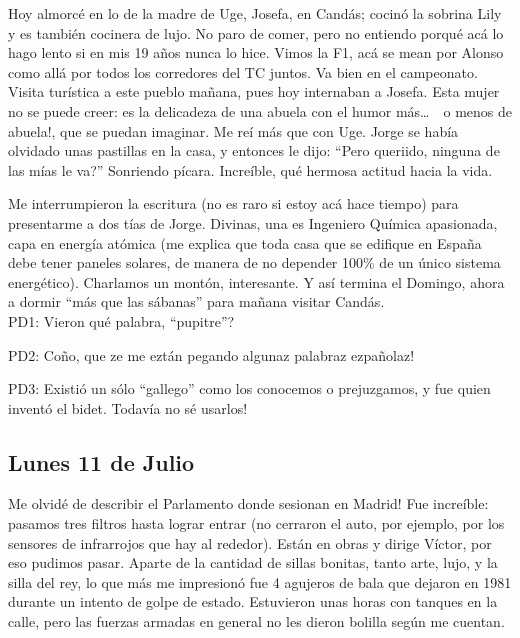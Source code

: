 Hoy almorc\'e en lo de la madre de Uge, Josefa, en Cand\'as; cocin\'o la
sobrina Lily y es tambi\'en cocinera de lujo. No paro de comer, pero no
entiendo porqu\'e ac\'a lo hago lento si en mis 19 a\~nos nunca lo hice. Vimos
la F1, ac\'a se mean por Alonso como all\'a por todos los corredores del
{\small TC} juntos. Va bien en el campeonato. Visita tur\'istica a este pueblo
ma\~nana, pues hoy internaban a Josefa. Esta mujer no se puede creer: es la
delicadeza de una abuela con el humor m\'as\ldots\ \ \textexclamdown o menos
de abuela!, que se puedan imaginar. Me re\'i m\'as que con Uge. Jorge se
hab\'ia olvidado unas pastillas en la casa, y entonces le dijo: ``Pero queriido,
\textquestiondown ninguna de las m\'ias le va?'' Sonriendo p\'icara.
Incre\'ible, qu\'e hermosa actitud hacia la vida.

Me interrumpieron la escritura (no es raro si estoy ac\'a hace tiempo) para
presentarme a dos t\'ias de Jorge. Divinas, una es Ingeniero Qu\'imica
apasionada, capa en energ\'ia at\'omica (me explica que toda casa que se
edifique en Espa\~na debe tener paneles solares, de manera de no depender
100\% de un \'unico sistema energ\'etico). Charlamos un mont\'on,
interesante. Y as\'i termina el Domingo, ahora a dormir ``m\'as que las
s\'abanas'' para ma\~nana visitar Cand\'as.\\

PD1: \textquestiondown Vieron qu\'e palabra, ``pupitre''?

PD2: \textexclamdown Co\~no, que ze me ezt\'an pegando algunaz palabraz
ezpa\~nolaz!

PD3: Existi\'o un s\'olo ``gallego'' como los conocemos o prejuzgamos, y fue
quien invent\'o el bidet. \textexclamdown Todav\'ia no s\'e usarlos!

\subsection*{Lunes 11 de Julio}

\textexclamdown Me olvid\'e de describir el Parlamento donde sesionan en
Madrid! Fue incre\'ible: pasamos tres filtros hasta lograr entrar (no cerraron
el auto, por ejemplo, por los sensores de infrarrojos que hay al rededor).
Est\'an en obras y dirige V\'ictor, por eso pudimos pasar. Aparte de la
cantidad de sillas bonitas, tanto arte, lujo, y la silla del rey, lo que m\'as
me impresion\'o fue 4 agujeros de bala que dejaron en 1981 durante un intento
de golpe de estado. Estuvieron unas horas con tanques en la calle, pero las
fuerzas armadas en general no les dieron bolilla seg\'un me cuentan.

